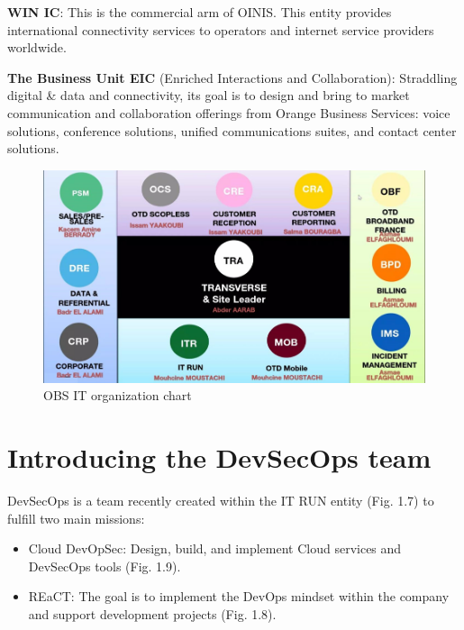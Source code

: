   \vspace{10pt} 

  \textbf{WIN IC}: This is the commercial arm of OINIS. This entity provides international connectivity services to operators and internet service providers worldwide.

  \vspace{10pt} 
  
  \textbf{The Business Unit EIC} (Enriched Interactions and Collaboration): Straddling digital \& data and connectivity, its goal is to design and bring to market communication and collaboration offerings from Orange Business Services: voice solutions, conference solutions, unified communications suites, and contact center solutions.

  \begin{figure}[H]
    \centering
    \includegraphics[width=17.5cm]{Figures/organigrame.png}
    \caption{OBS IT organization chart}
    \label{fig:vue-snoc-pos}
  \end{figure}

\section{Introducing the DevSecOps team}

DevSecOps is a team recently created within the IT RUN entity (Fig. 1.7) to fulfill two main missions:
\begin{itemize}
    \item Cloud DevOpSec: Design, build, and implement Cloud services and DevSecOps tools (Fig. 1.9).
    \item REaCT: The goal is to implement the DevOps mindset within the company and support development projects (Fig. 1.8).
\end{itemize}

